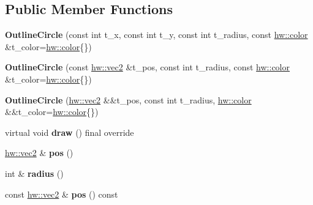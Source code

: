 \subsection*{Public Member Functions}
\begin{DoxyCompactItemize}
\item 
\mbox{\label{classdummy__api_1_1OutlineCircle_a6abfc512e0ba179e2e5d7640edbd5c61}} 
{\bfseries Outline\+Circle} (const int t\+\_\+x, const int t\+\_\+y, const int t\+\_\+radius, const \mbox{\hyperlink{structhw_1_1color}{hw\+::color}} \&t\+\_\+color=\mbox{\hyperlink{structhw_1_1color}{hw\+::color}}\{\})
\item 
\mbox{\label{classdummy__api_1_1OutlineCircle_a11df38a8c43c42b58cacb3de0e37ff84}} 
{\bfseries Outline\+Circle} (const \mbox{\hyperlink{structhw_1_1vec2}{hw\+::vec2}} \&t\+\_\+pos, const int t\+\_\+radius, const \mbox{\hyperlink{structhw_1_1color}{hw\+::color}} \&t\+\_\+color=\mbox{\hyperlink{structhw_1_1color}{hw\+::color}}\{\})
\item 
\mbox{\label{classdummy__api_1_1OutlineCircle_a613a7f4b53ff2a122e9b0f6344cdff75}} 
{\bfseries Outline\+Circle} (\mbox{\hyperlink{structhw_1_1vec2}{hw\+::vec2}} \&\&t\+\_\+pos, const int t\+\_\+radius, \mbox{\hyperlink{structhw_1_1color}{hw\+::color}} \&\&t\+\_\+color=\mbox{\hyperlink{structhw_1_1color}{hw\+::color}}\{\})
\item 
\mbox{\label{classdummy__api_1_1OutlineCircle_ab23c1031c2165d5e03fee84434177844}} 
virtual void {\bfseries draw} () final override
\item 
\mbox{\label{classdummy__api_1_1OutlineCircle_aa24e7368991757fb28eda016b650111e}} 
\mbox{\hyperlink{structhw_1_1vec2}{hw\+::vec2}} \& {\bfseries pos} ()
\item 
\mbox{\label{classdummy__api_1_1OutlineCircle_aca8b58f073be8e22c0cb119ac65a92e6}} 
int \& {\bfseries radius} ()
\item 
\mbox{\label{classdummy__api_1_1OutlineCircle_aa66bd50839710367f8e6a1eb6c68a650}} 
const \mbox{\hyperlink{structhw_1_1vec2}{hw\+::vec2}} \& {\bfseries pos} () const

\end{DoxyCompactItemize}
